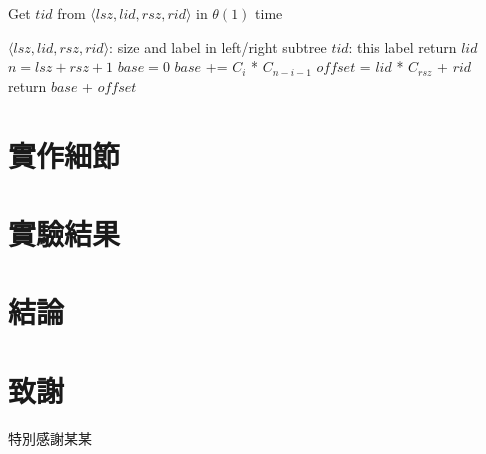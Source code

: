 \documentclass{gapd}
\begin{document}
\begin{algorithm*}
  \caption{Get $tid$ from $\langle\mathit{lsz},\mathit{lid},\mathit{rsz},\mathit{rid}\rangle$ in $\theta(1)$ time}
  \label{alg:FunctionTid}
  \begin{algorithmic}[1]
    \Require
      $\langle\mathit{lsz},\mathit{lid},\mathit{rsz},\mathit{rid}\rangle$: size and label in left/right subtree
    \Ensure
      $\mathit{tid}$: this label
      \State return $\mathit{lid}$
    \EndIf
    \State $n = \mathit{lsz}+\mathit{rsz}+1$
    \State $\mathit{base} = 0$
      \State $\mathit{base}$ += $C_i$ * $C_{n-i-1}$
    \EndFor
    \State $\mathit{offset}$ = $\mathit{lid}$ * $C_{\mathit{rsz}}$ + $\mathit{rid}$
    \State return $\mathit{base}$ + $\mathit{offset}$
  \end{algorithmic}
\end{algorithm*}

\section{實作細節}

\section{實驗結果}

\section{結論}
\label{sec:Conclusion}

\section*{致謝}

特別感謝某某
\end{document}
